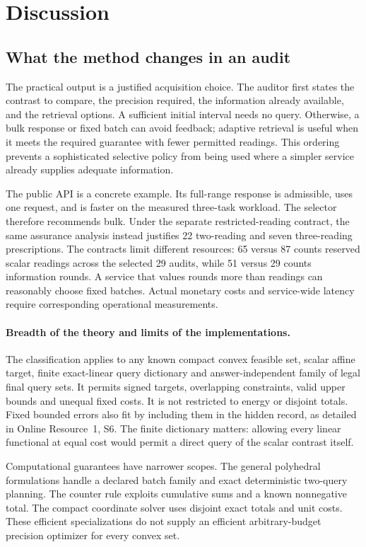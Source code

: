 \documentclass[12pt]{article}
\begin{document}
\section{Discussion}\subsection{What the method changes in an audit}
The practical output is a justified acquisition choice. The auditor first
states the contrast to compare, the precision required, the information
already available, and the retrieval options. A sufficient initial interval
needs no query. Otherwise, a bulk response or fixed batch can avoid feedback;
adaptive retrieval is useful when it meets the required guarantee with fewer
permitted readings. This ordering prevents a sophisticated selective policy
from being used where a simpler service already supplies adequate information.

The public API is a concrete example. Its full-range response is admissible,
uses one request, and is faster on the measured three-task workload. The
selector therefore recommends bulk. Under the separate restricted-reading
contract, the same assurance analysis instead justifies 22 two-reading and
seven three-reading prescriptions. The contracts limit different resources:
65 versus 87 counts reserved scalar readings across the selected 29 audits,
while 51 versus 29 counts information rounds. A service that values rounds
more than readings can reasonably choose fixed batches. Actual monetary
costs and service-wide latency require corresponding operational measurements.

\paragraph{Breadth of the theory and limits of the implementations.}
The classification applies to any known compact convex feasible set, scalar
affine target, finite exact-linear query dictionary and answer-independent
family of legal final query sets. It permits signed targets, overlapping
constraints, valid upper bounds and unequal fixed costs. It is not restricted
to energy or disjoint totals. Fixed bounded errors also fit by including
them in the hidden record, as detailed in Online Resource~1, S6.
The finite dictionary matters: allowing every linear functional at equal
cost would permit a direct query of the scalar contrast itself.

Computational guarantees have narrower scopes. The general polyhedral
formulations handle a declared batch family and exact deterministic
two-query planning. The counter rule exploits cumulative sums and a known
nonnegative total. The compact coordinate solver uses disjoint exact totals
and unit costs. These efficient specializations do not supply an efficient
arbitrary-budget precision optimizer for every convex set.
\end{document}
